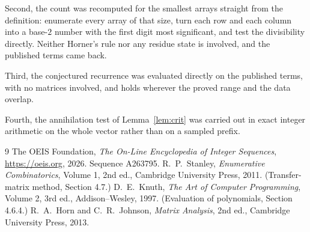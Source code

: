 \documentclass[11pt,a4paper]{article}
\theoremstyle{plain}
\theoremstyle{definition}
\begin{document}
Second, the count was recomputed for the smallest arrays straight from the definition:
enumerate every array of that size, turn each row and each column into a base-$2$ number with
the first digit most significant, and test the divisibility directly. Neither Horner's rule nor
any residue state is involved, and the published terms came back.

Third, the conjectured recurrence was evaluated directly on the published terms, with no
matrices involved, and holds wherever the proved range and the data overlap.

Fourth, the annihilation test of Lemma~\ref{lem:crit} was carried out in exact integer
arithmetic on the whole vector rather than on a sampled prefix.

\begin{thebibliography}{9}
 The OEIS Foundation, \emph{The On-Line Encyclopedia of Integer
Sequences}, \url{https://oeis.org}, 2026. Sequence A263795.
 R.~P.~Stanley, \emph{Enumerative Combinatorics}, Volume 1, 2nd ed.,
Cambridge University Press, 2011. (Transfer-matrix method, Section 4.7.)
 D.~E.~Knuth, \emph{The Art of Computer Programming}, Volume 2, 3rd ed.,
Addison--Wesley, 1997. (Evaluation of polynomials, Section 4.6.4.)
 R.~A.~Horn and C.~R.~Johnson, \emph{Matrix Analysis}, 2nd ed., Cambridge
University Press, 2013.
\end{thebibliography}
\end{document}
